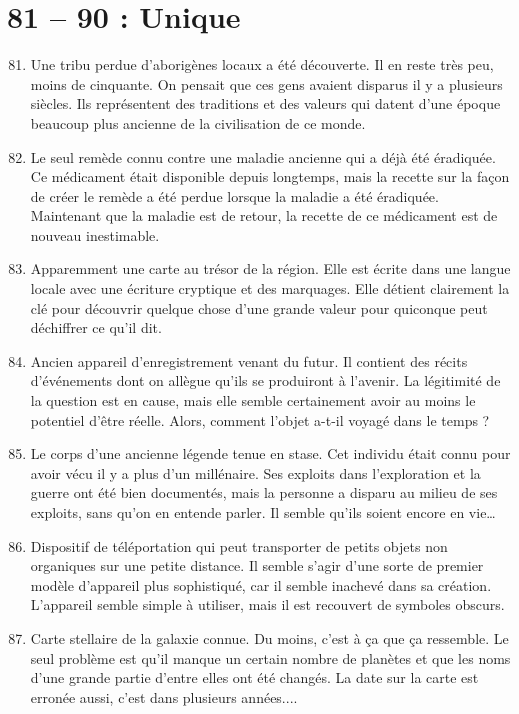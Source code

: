 \documentclass{article}
\begin{document}
\section*{81 -- 90 : Unique}
\begin{enumerate}
	\setcounter{enumi}{80}
	\item Une tribu perdue d'aborigènes locaux a été découverte. Il en reste très peu, moins de cinquante. On pensait que ces gens avaient disparus il y a plusieurs siècles. Ils représentent des traditions et des valeurs qui datent d'une époque beaucoup plus ancienne de la civilisation de ce monde.
	\item Le seul remède connu contre une maladie ancienne qui a déjà été éradiquée. Ce médicament était disponible depuis longtemps, mais la recette sur la façon de créer le remède a été perdue lorsque la maladie a été éradiquée. Maintenant que la maladie est de retour, la recette de ce médicament est de nouveau inestimable.
	\item Apparemment une carte au trésor de la région. Elle est écrite dans une langue locale avec une écriture cryptique et des marquages. Elle détient clairement la clé pour découvrir quelque chose d'une grande valeur pour quiconque peut déchiffrer ce qu'il dit.
	\item Ancien appareil d'enregistrement venant du futur. Il contient des récits d'événements dont on allègue qu'ils se produiront à l'avenir. La légitimité de la question est en cause, mais elle semble certainement avoir au moins le potentiel d'être réelle. Alors, comment l'objet a-t-il voyagé dans le temps ?
	\item Le corps d'une ancienne légende tenue en stase. Cet individu était connu pour avoir vécu il y a plus d'un millénaire. Ses exploits dans l'exploration et la guerre ont été bien documentés, mais la personne a disparu au milieu de ses exploits, sans qu'on en entende parler. Il semble qu'ils soient encore en vie\ldots
	\item Dispositif de téléportation qui peut transporter de petits objets non organiques sur une petite distance. Il semble s'agir d'une sorte de premier modèle d'appareil plus sophistiqué, car il semble inachevé dans sa création. L'appareil semble simple à utiliser, mais il est recouvert de symboles obscurs.
	\item Carte stellaire de la galaxie connue. Du moins, c'est à ça que ça ressemble. Le seul problème est qu'il manque un certain nombre de planètes et que les noms d'une grande partie d'entre elles ont été changés. La date sur la carte est erronée aussi, c'est dans plusieurs années....

\end{enumerate}
\end{document}

